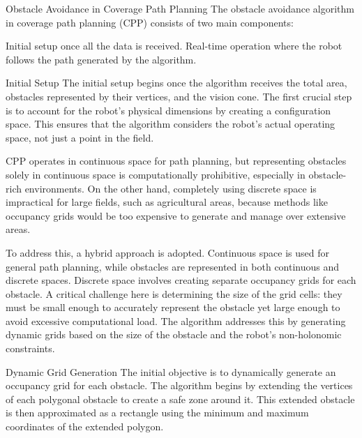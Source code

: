 \vspace*{6mm}  





Obstacle Avoidance in Coverage Path Planning
The obstacle avoidance algorithm in coverage path planning (CPP) consists of two main components:

\vspace*{6mm}  

Initial setup once all the data is received.
Real-time operation where the robot follows the path generated by the algorithm.


\vspace*{6mm}  


Initial Setup
The initial setup begins once the algorithm receives the total area, obstacles represented by their vertices, and the vision cone. The first crucial step is to account for the robot's physical dimensions by creating a configuration space. This ensures that the algorithm considers the robot's actual operating space, not just a point in the field.

\vspace*{6mm}  

CPP operates in continuous space for path planning, but representing obstacles solely in continuous space is computationally prohibitive, especially in obstacle-rich environments. On the other hand, completely using discrete space is impractical for large fields, such as agricultural areas, because methods like occupancy grids would be too expensive to generate and manage over extensive areas.

\vspace*{6mm}  

To address this, a hybrid approach is adopted. Continuous space is used for general path planning, while obstacles are represented in both continuous and discrete spaces. Discrete space involves creating separate occupancy grids for each obstacle. A critical challenge here is determining the size of the grid cells: they must be small enough to accurately represent the obstacle yet large enough to avoid excessive computational load. The algorithm addresses this by generating dynamic grids based on the size of the obstacle and the robot's non-holonomic constraints.

\vspace*{6mm}  

Dynamic Grid Generation
The initial objective is to dynamically generate an occupancy grid for each obstacle. The algorithm begins by extending the vertices of each polygonal obstacle to create a safe zone around it. This extended obstacle is then approximated as a rectangle using the minimum and maximum coordinates of the extended polygon.

